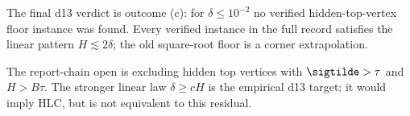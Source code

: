 \begin{remark}
\numbadge The final d13 verdict is outcome (c): for
\(\delta\le10^{-2}\) no verified hidden-top-vertex floor instance was found.
Every verified instance in the full record satisfies the linear pattern
\(H\lesssim2\delta\); the old square-root floor is a corner extrapolation.
\end{remark}

\begin{openproblem}
\openbadge The report-chain open is excluding hidden top vertices with
\(\sigtilde>\tau\) and \(H>B\tau\).  The stronger linear law
\(\delta\ge cH\) is the empirical d13 target; it would imply HLC, but is not
equivalent to this residual.
\end{openproblem}
